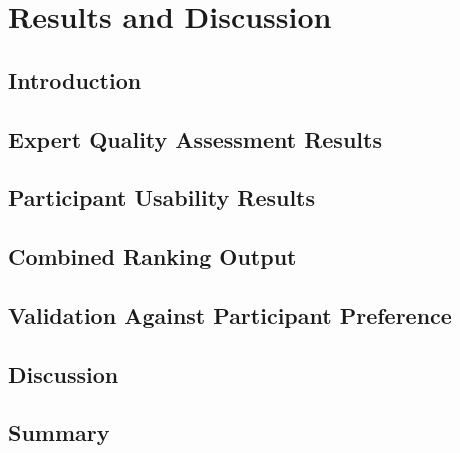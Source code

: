 \chapter{Results and Discussion}

\section{Introduction}

\section{Expert Quality Assessment Results}

\section{Participant Usability Results}

\section{Combined Ranking Output}

\section{Validation Against Participant Preference}

\section{Discussion}

\section{Summary}
